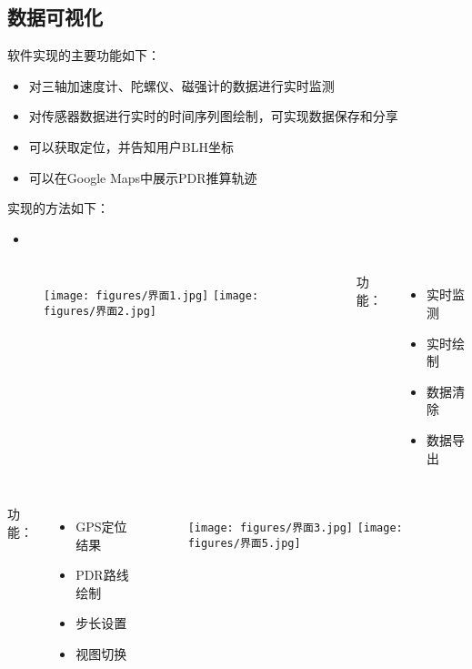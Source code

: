 \documentclass[10pt,xcolor=dvipsnames,fontset=none,punct=CCT]{ctexbeamer}
\begin{document}
\subsection{数据可视化}
\begin{frame}
  软件实现的主要功能如下：
  \begin{itemize}
    \item 对三轴加速度计、陀螺仪、磁强计的数据进行实时监测
    \item 对传感器数据进行实时的时间序列图绘制，可实现数据保存和分享
    \item 可以获取定位，并告知用户BLH坐标
    \item 可以在Google Maps中展示PDR推算轨迹
  \end{itemize}
  实现的方法如下：
  \begin{itemize}
    \item 
  \end{itemize}
\end{frame}

\begin{frame}
  \begin{columns}
  \begin{figure}[ht]
    \centering
    \texttt{[image: figures/界面1.jpg]}
    \texttt{[image: figures/界面2.jpg]}
  \end{figure}
  功能：
  \begin{itemize}
    \item 实时监测
    \item 实时绘制
    \item 数据清除
    \item 数据导出
  \end{itemize}
  \end{columns}
\end{frame}

\begin{frame}
  \begin{columns}
    功能：
    \begin{itemize}
      \item GPS定位结果
      \item PDR路线绘制
      \item 步长设置
      \item 视图切换
    \end{itemize}
    \begin{figure}[ht]
      \centering
      \texttt{[image: figures/界面3.jpg]}
      \texttt{[image: figures/界面5.jpg]}
    \end{figure}
    \end{columns}
\end{frame}
\end{document}
